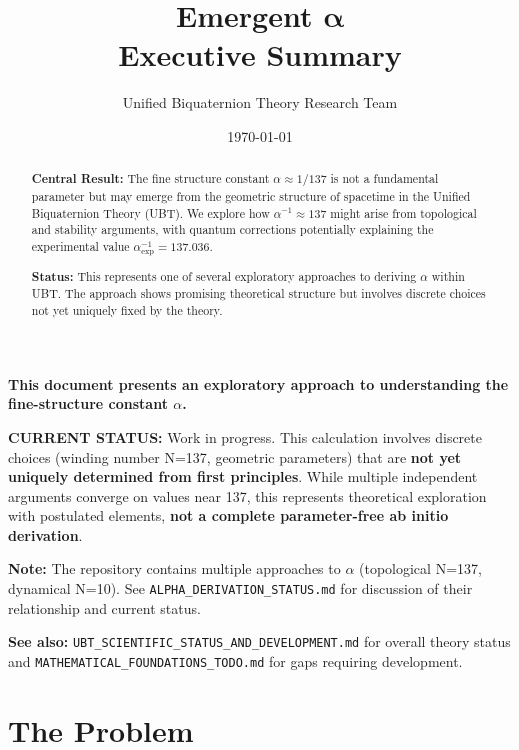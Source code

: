 \documentclass[12pt, a4paper]{article}
\title{\textbf{\Huge Emergent $\boldsymbol{\alpha}$}\\[0.5em]
\Large Executive Summary}
\author{Unified Biquaternion Theory Research Team}
\date{\today}
\begin{document}
\maketitle

\begin{tcolorbox}[colback=red!5!white,colframe=red!75!black,title=\textbf{CRITICAL DISCLAIMER - READ FIRST}]
\textbf{This document presents an exploratory approach to understanding the fine-structure constant $\alpha$.}

\textbf{CURRENT STATUS:} Work in progress. This calculation involves discrete choices (winding number N=137, geometric parameters) that are \textbf{not yet uniquely determined from first principles}. While multiple independent arguments converge on values near 137, this represents theoretical exploration with postulated elements, \textbf{not a complete parameter-free ab initio derivation}.

\textbf{Note:} The repository contains multiple approaches to $\alpha$ (topological N=137, dynamical N=10). See \texttt{ALPHA\_DERIVATION\_STATUS.md} for discussion of their relationship and current status.

\textbf{See also:} \texttt{UBT\_SCIENTIFIC\_STATUS\_AND\_DEVELOPMENT.md} for overall theory status and \texttt{MATHEMATICAL\_FOUNDATIONS\_TODO.md} for gaps requiring development.
\end{tcolorbox}

\vspace{1em}

\begin{abstract}
\noindent\textcolor{ubtblue}{\textbf{Central Result:}} The fine structure constant $\alpha \approx 1/137$ is not a fundamental parameter but may emerge from the geometric structure of spacetime in the Unified Biquaternion Theory (UBT). We explore how $\alpha^{-1} \approx 137$ might arise from topological and stability arguments, with quantum corrections potentially explaining the experimental value $\alpha_{\text{exp}}^{-1} = 137.036$.

\textbf{Status:} This represents one of several exploratory approaches to deriving $\alpha$ within UBT. The approach shows promising theoretical structure but involves discrete choices not yet uniquely fixed by the theory.
\end{abstract}

\section{The Problem}
\end{document}
